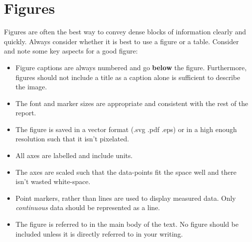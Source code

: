 \section{Figures}
Figures are often the best way to convey dense blocks of information clearly and quickly. Always consider whether it is best to use a figure or a table. Consider  and note some key aspects for a good figure:
\begin{itemize}
    \item Figure captions are always numbered and go \textbf{below} the figure. Furthermore, figures should not include a title as a caption alone is sufficient to describe the image.
    \item The font and marker sizes are appropriate and consistent with the rest of the report.
    \item The figure is saved in a vector format (.svg .pdf .eps) or in a high enough resolution such that it isn't pixelated.
    \item All axes are labelled and include units.
    \item The axes are scaled such that the data-points fit the space well and there isn't wasted white-space.
    \item Point markers, rather than lines are used to display measured data. Only \textit{continuous} data should be represented as a line.
    \item The figure is referred to in the main body of the text. No figure should be included unless it is directly referred to in your writing.
\end{itemize}

